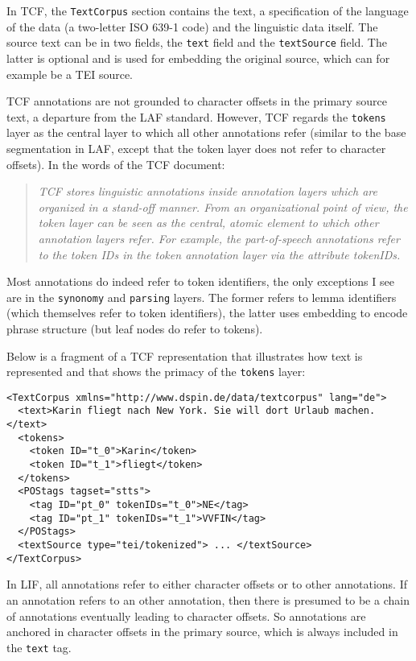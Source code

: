 \documentclass[11pt]{article}
\newcommand{\tag}[1]{{\tt #1}}
\newenvironment{example}
    {\begin{tcolorbox}\small}
    {\end{tcolorbox}}
\begin{document}
In TCF, the \tag{TextCorpus} section contains the text, a specification of the language of the data (a two-letter ISO 639-1 code) and the linguistic data itself. The source text can be in two fields, the \tag{text} field and the \tag{textSource} field. The latter is optional and is used for embedding the original source, which can for example be a TEI source. 

TCF annotations are not grounded to character offsets in the primary source text, a departure from the LAF standard. However, TCF regards the \tag{tokens} layer as the central layer to which all other annotations refer (similar to the base segmentation in LAF, except that the token layer does not refer to character offsets). In the words of the TCF document:

\begin{quote}
{\em TCF stores linguistic annotations inside annotation layers which are organized in a stand-off manner. From an organizational point of view, the token layer can be seen as the central, atomic element to which other annotation layers refer. For example, the part-of-speech annotations refer to the token IDs in the token annotation layer via the attribute tokenIDs.}
\end{quote}

Most annotations do indeed refer to token identifiers, the only exceptions I see are in the \tag{synonomy} and \tag{parsing} layers. The former refers to lemma identifiers (which themselves refer to token identifiers), the latter uses embedding to encode phrase structure (but leaf nodes do refer to tokens). 

Below is a fragment of a TCF representation that illustrates how text is represented and that shows the primacy of the \tag{tokens} layer:

\begin{example}
\begin{verbatim}
<TextCorpus xmlns="http://www.dspin.de/data/textcorpus" lang="de">
  <text>Karin fliegt nach New York. Sie will dort Urlaub machen.</text>
  <tokens>
    <token ID="t_0">Karin</token>
    <token ID="t_1">fliegt</token>
  </tokens>
  <POStags tagset="stts">
    <tag ID="pt_0" tokenIDs="t_0">NE</tag>
    <tag ID="pt_1" tokenIDs="t_1">VVFIN</tag>
  </POStags>
  <textSource type="tei/tokenized"> ... </textSource>
</TextCorpus>
\end{verbatim}
\end{example}

In LIF, all annotations refer to either character offsets or to other annotations. If an annotation refers to an other annotation, then there is presumed to be a chain of annotations eventually leading to character offsets. So annotations are anchored in character offsets in the primary source, which is always included in the \tag{text} tag.
\end{document}
